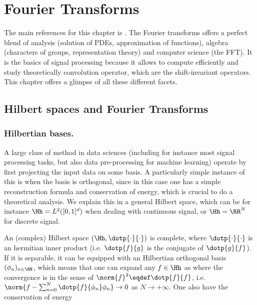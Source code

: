 
\chapter{Fourier Transforms}
\label{sec-fourier}

The main references for this chapter is \cite{mallat2008wavelet}.
%
The Fourier transforms offers a perfect blend of analysis (solution of PDEs, approximation of functions), algebra (characters of groups, representation theory) and computer science (the FFT). 
%
It is the basics of signal processing because it allows to compute efficiently and study theoretically convolution operator, which are the shift-invariant operators. 
%
This chapter offers a glimpse of all these different facets. 

\newcommand{\piN}{\frac{2\imath\pi}{N}}

\section{Hilbert spaces and Fourier Transforms}

\subsection{Hilbertian bases.}

A large class of method in data sciences (including for instance most signal processing tasks, but also data pre-processing for machine learning) operate by first projecting the input data on some basis. A particularly simple instance of this is when the basis is orthogonal, since in this case one has a simple reconstruction formula and conservation of energy, which is crucial to do a theoretical analysis. We explain this in a general Hilbert space, which can be for instance $\Hh = L^2([0,1]^d)$ when dealing with continuous signal, or $\Hh=\RR^N$ for discrete signal.  

An (complex) Hilbert space $(\Hh,\dotp{\cdot}{\cdot})$ is complete, where $\dotp{\cdot}{\cdot}$ is an hermitian inner product (i.e. $\dotp{f}{g}$ is the conjugate of $\dotp{g}{f}$). If it is separable, it can be equipped with an Hilbertian orthogonal basis $(\phi_n)_{n \in \NN}$, which means that one can expand any $f \in \Hh$ as
where the convergence is in the sense of $\norm{f}^2 \eqdef \dotp{f}{f}$, i.e. $\norm{ f - \sum_{n=0}^N \dotp{f}{\phi_n} \phi_n } \rightarrow 0$ as $N \rightarrow +\infty$. One also have the conservation of energy 

